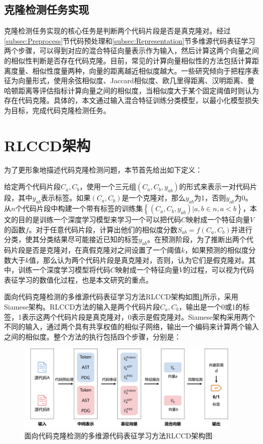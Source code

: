 \subsection{克隆检测任务实现}
\label{subsec:Clone detection}
克隆检测任务实现的核心任务是判断两个代码片段是否是真克隆对。经过\ref{subsec:Preprocess}节代码预处理和\ref{subsec:Representation}节多维源代码表征学习两个步骤，可以得到对应的混合特征向量表示作为输入，然后计算这两个向量之间的相似性判断是否存在代码克隆。目前，常见的计算向量相似性的方法包括计算距离度量、相似性度量两种，向量的距离越近相似度越大。一些研究倾向于把程序表征为向量形式，使用余弦相似度、Jaccard相似度、欧几里得距离、汉明距离、曼哈顿距离等评估指标计算向量之间的相似度，当相似度大于某个固定阈值时则认为存在代码克隆。具体的，本文通过输入混合特征训练分类模型，以最小化模型损失为目标，完成代码克隆检测任务。

\section{RLCCD架构}
\label{sec:RLCCD flow}

为了更形象地描述代码克隆检测问题，本节首先给出如下定义：

给定两个代码片段$C_{a},C_{b}$，使用一个三元组$(C_{a},C_{b},y_{ab})$的形式来表示一对代码片段，其中$y_{ab}$表示标签。如果$(C_{a},C_{b})$是一个克隆对，那么$y_{ab}$为1，否则$y_{ab}$为0。从$n$个代码片段中构建一个带有标签的训练集$\left\{(C_{a},C_{b},y_{ab})|a,b \in n,a<b\right\}$，本文的目的是训练一个深度学习模型来学习一个可以把代码$C$映射成一个特征向量$V$的函数$f$。对于任意代码片段，计算出他们的相似度分数$S_{ab} = f(C_{a},C_{b})$并进行分类，使其分类结果尽可能接近已知的标签$y_{ab}$。在预测阶段，为了推断出两个代码片段是否是克隆对，在真假克隆对之间设置了一个阈值$k$，如果预测的相似度分数大于$k$值，那么认为两个代码片段是真克隆对，否则，认为它们是假克隆对。其中，训练一个深度学习模型将代码$C$映射成一个特征向量$V$的过程，可以视为代码表征学习的数值化过程，也是本文研究的重点。



面向代码克隆检测的多维源代码表征学习方法RLCCD架构如图\ref{fig:flow}所示，采用Siamese架构。RLCCD方法的输入是两个代码片段$C_{a},C_{b}$，输出是一个0或1的标签，1表示这两个代码片段是真克隆对，0表示是假克隆对。Siamese架构采用两个不同的输入，通过两个具有共享权值的相似子网络，输出一个编码来计算两个输入之间的相似度。整个方法的执行包括四个步骤，分别是：
\begin{figure}[H]
    \centering
    \includegraphics[width=0.95\textwidth]{figures/flow}
    \caption{面向代码克隆检测的多维源代码表征学习方法RLCCD架构图}
    \label{fig:flow}
\end{figure}

